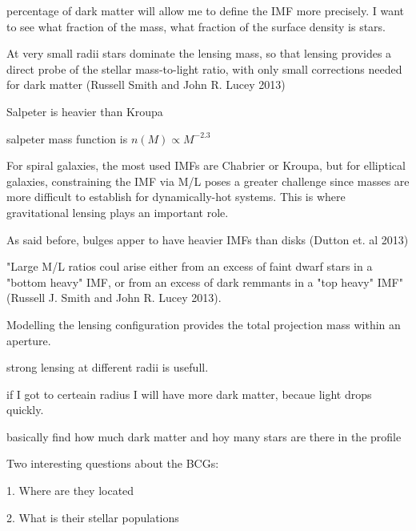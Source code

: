 percentage of dark matter will allow me to define the IMF more precisely. I want to see what fraction of the mass, what fraction of the surface density is stars. 

At very small radii stars dominate the lensing mass, so that lensing provides a direct probe of the stellar mass-to-light ratio, with only small corrections needed for dark matter (Russell Smith and John R. Lucey 2013)

Salpeter is heavier than Kroupa 

salpeter mass function is $n(M)\propto M^{-2.3}$ 

For spiral galaxies, the most used IMFs are Chabrier or Kroupa, but for elliptical galaxies, constraining the IMF via M/L poses a greater challenge since masses are more difficult to establish for dynamically-hot systems. This is where gravitational lensing plays an important role.

As said before, bulges apper to have heavier IMFs than disks (Dutton et. al 2013)

"Large M/L ratios coul arise either from an excess of faint dwarf stars in a "bottom heavy" IMF, or from an excess of dark remmants in a "top heavy" IMF" (Russell J. Smith and John R. Lucey 2013).

Modelling the lensing configuration provides the total projection mass within an aperture.

strong lensing at different radii is usefull.

if I got to certeain radius I will have more dark matter, becaue light drops quickly. 

basically find how much dark matter and hoy many stars are there in the profile

Two interesting questions about the BCGs:

1. Where are they located

2. What is their stellar populations


\newpage
